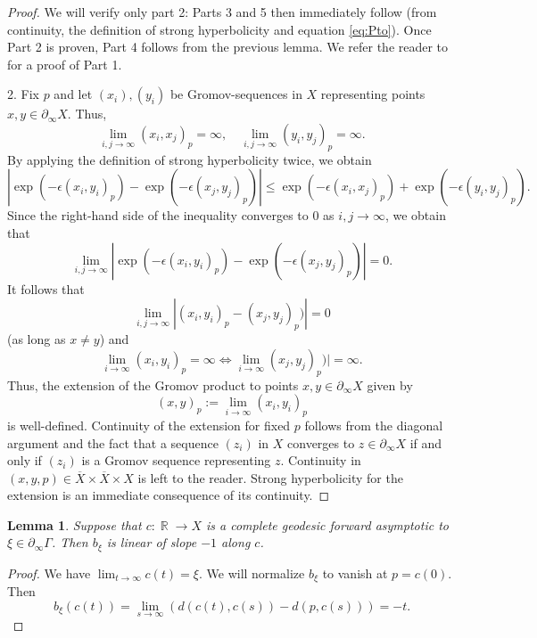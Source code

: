\documentclass[12pt]{amsbook}%
\newtheorem{lem}[thm]{Lemma}
\theoremstyle{definition}
\theoremstyle{remark}
\numberwithin{section}{chapter}
\numberwithin{subsection}{section}
\numberwithin{figure}{chapter}
\DeclareMathOperator{\R}{\mathbb{R}}
\def\Ga{\Gamma}
\def\geo{\partial_\infty}
\def\ol{\overline}
\begin{document}
\begin{proof} We will verify only part 2: Parts 3 and 5 then immediately follow 
(from continuity, the definition of strong hyperbolicity and equation \eqref{eq:Pto}).  Once Part 2 is proven, Part 4 follows from the previous lemma. 
We refer the reader to \cite{Nica-Spakula} for a proof of Part 1. 

2. Fix $p$ and let $(x_i), (y_i)$ be Gromov-sequences in $X$ representing points $x, y\in \geo X$. Thus,
$$
\lim_{i,j\to\infty} (x_i,x_j)_p=\infty, \quad \lim_{i,j\to\infty} (y_i,y_j)_p=\infty. 
$$
By applying the definition of strong hyperbolicity twice, we obtain
$$
|\exp(-\epsilon (x_i, y_i)_p) - \exp(-\epsilon (x_j, y_j)_p) | \leqslant \exp(-\epsilon (x_i, x_j)_p) + \exp(-\epsilon (y_i, y_j)_p). 
$$
Since the right-hand side of the inequality converges to $0$ as $i, j\to\infty$, we obtain that 
$$
\lim_{i,j\to\infty} |\exp(-\epsilon (x_i, y_i)_p) - \exp(-\epsilon (x_j, y_j)_p) | =0. 
$$
It follows that 
$$
\lim_{i,j\to\infty} |(x_i, y_i)_p -  (x_j, y_j)_p) | =0 
$$
(as long as $x\ne y$) and 
$$
\lim_{i\to\infty} (x_i, y_i)_p = \infty \iff \lim_{i\to\infty} (x_j, y_j)_p) | =\infty.   
$$ 
Thus, the extension of the Gromov product to points $x, y\in \geo X$ given by
$$
(x,y)_p:= \lim_{i\to\infty} (x_i, y_i)_p
$$
is well-defined. 
Continuity of the extension for fixed $p$ follows from the diagonal argument and 
the fact that a sequence $(z_i)$ in $X$ converges to $z\in \geo X$ if and only if $(z_i)$ is a Gromov sequence 
representing $z$. Continuity in $(x, y, p)\in \ol{X}\times \ol{X}\times X$  is left to the reader. Strong hyperbolicity for the extension is an immediate consequence 
of its continuity. 
\end{proof}




\begin{lem}\label{lem:linear}
Suppose that $c: \R\to X$ is a complete geodesic forward asymptotic to $\xi\in \geo \Ga$. Then $b_\xi$ is linear of slope $-1$ along $c$. 
\end{lem}
\begin{proof} We have $\lim_{t\to\infty}c(t)=\xi$. We will normalize $b_\xi$ to vanish at $p=c(0)$. Then 
$$
b_\xi(c(t))= \lim_{s\to \infty} (d(c(t), c(s))- d(p, c(s)))= -t. 
$$
\end{proof}
\end{document}
